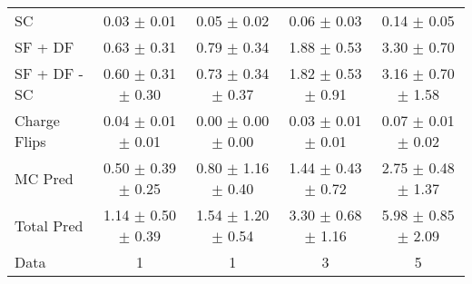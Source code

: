 \begin{tabular}{l|cccc}
                                 SC &  0.03 $\pm$  0.01 &  0.05 $\pm$  0.02 &  0.06 $\pm$  0.03 &  0.14 $\pm$  0.05 \\
                            SF + DF &  0.63 $\pm$  0.31 &  0.79 $\pm$  0.34 &  1.88 $\pm$  0.53 &  3.30 $\pm$  0.70 \\
\hline
                       SF + DF - SC &  0.60 $\pm$  0.31 $\pm$  0.30 &  0.73 $\pm$  0.34 $\pm$  0.37 &  1.82 $\pm$  0.53 $\pm$  0.91 &  3.16 $\pm$  0.70 $\pm$  1.58 \\
\hline\hline
                       Charge Flips &  0.04 $\pm$  0.01 $\pm$  0.01 &  0.00 $\pm$  0.00 $\pm$  0.00 &  0.03 $\pm$  0.01 $\pm$  0.01 &  0.07 $\pm$  0.01 $\pm$  0.02 \\
\hline
                            MC Pred &  0.50 $\pm$  0.39 $\pm$  0.25 &  0.80 $\pm$  1.16 $\pm$  0.40 &  1.44 $\pm$  0.43 $\pm$  0.72 &  2.75 $\pm$  0.48 $\pm$  1.37 \\
\hline
                         Total Pred &  1.14 $\pm$  0.50 $\pm$  0.39 &  1.54 $\pm$  1.20 $\pm$  0.54 &  3.30 $\pm$  0.68 $\pm$  1.16 &  5.98 $\pm$  0.85 $\pm$  2.09 \\
\hline\hline
                               Data &     1 &     1 &     3 &     5 \\
\hline\hline
\end{tabular}

